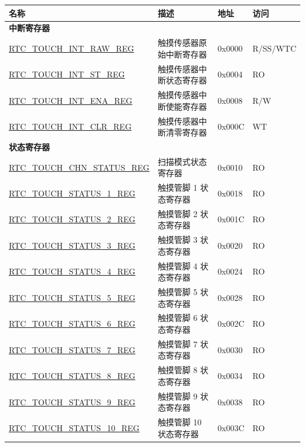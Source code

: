 \begin{longtable}{ | l | p{8cm} | p{1.3cm} | p{1.7cm} | }
\hline\rowcolor{lightgray}
\textbf{名称} & \textbf{描述} & \textbf{地址} & \textbf{访问} \\ \hline
\endhead
\multicolumn{4}{|l|}{\textbf{中断寄存器}} \\ \hline
\hyperref[regdesc:RTCTOUCHINTRAWREG]{RTC\_TOUCH\_INT\_RAW\_REG} & 触摸传感器原始中断寄存器 & 0x0000 & R/SS/WTC \\ \hline
\hyperref[regdesc:RTCTOUCHINTSTREG]{RTC\_TOUCH\_INT\_ST\_REG} & 触摸传感器中断状态寄存器 & 0x0004 & RO \\ \hline
\hyperref[regdesc:RTCTOUCHINTENAREG]{RTC\_TOUCH\_INT\_ENA\_REG} & 触摸传感器中断使能寄存器 & 0x0008 & R/W \\ \hline
\hyperref[regdesc:RTCTOUCHINTCLRREG]{RTC\_TOUCH\_INT\_CLR\_REG} & 触摸传感器中断清零寄存器 & 0x000C & WT \\ \hline
\multicolumn{4}{|l|}{\textbf{状态寄存器}} \\ \hline
\hyperref[regdesc:RTCTOUCHCHNSTATUSREG]{RTC\_TOUCH\_CHN\_STATUS\_REG} & 扫描模式状态寄存器 & 0x0010 & RO \\ \hline
\hyperref[regdesc:RTCTOUCHSTATUS0REG]{RTC\_TOUCH\_STATUS\_1\_REG} & 触摸管脚 1 状态寄存器 & 0x0018 & RO \\ \hline
\hyperref[regdesc:RTCTOUCHSTATUS0REG]{RTC\_TOUCH\_STATUS\_2\_REG} & 触摸管脚 2 状态寄存器 & 0x001C & RO \\ \hline
\hyperref[regdesc:RTCTOUCHSTATUS0REG]{RTC\_TOUCH\_STATUS\_3\_REG} & 触摸管脚 3 状态寄存器 & 0x0020 & RO \\ \hline
\hyperref[regdesc:RTCTOUCHSTATUS0REG]{RTC\_TOUCH\_STATUS\_4\_REG} & 触摸管脚 4 状态寄存器 & 0x0024 & RO \\ \hline
\hyperref[regdesc:RTCTOUCHSTATUS0REG]{RTC\_TOUCH\_STATUS\_5\_REG} & 触摸管脚 5 状态寄存器 & 0x0028 & RO \\ \hline
\hyperref[regdesc:RTCTOUCHSTATUS0REG]{RTC\_TOUCH\_STATUS\_6\_REG} & 触摸管脚 6 状态寄存器 & 0x002C & RO \\ \hline
\hyperref[regdesc:RTCTOUCHSTATUS0REG]{RTC\_TOUCH\_STATUS\_7\_REG} & 触摸管脚 7 状态寄存器 & 0x0030 & RO \\ \hline
\hyperref[regdesc:RTCTOUCHSTATUS0REG]{RTC\_TOUCH\_STATUS\_8\_REG} & 触摸管脚 8 状态寄存器 & 0x0034 & RO \\ \hline
\hyperref[regdesc:RTCTOUCHSTATUS0REG]{RTC\_TOUCH\_STATUS\_9\_REG} & 触摸管脚 9 状态寄存器 & 0x0038 & RO \\ \hline
\hyperref[regdesc:RTCTOUCHSTATUS0REG]{RTC\_TOUCH\_STATUS\_10\_REG} & 触摸管脚 10 状态寄存器 & 0x003C & RO \\ \hline

\end{longtable}
